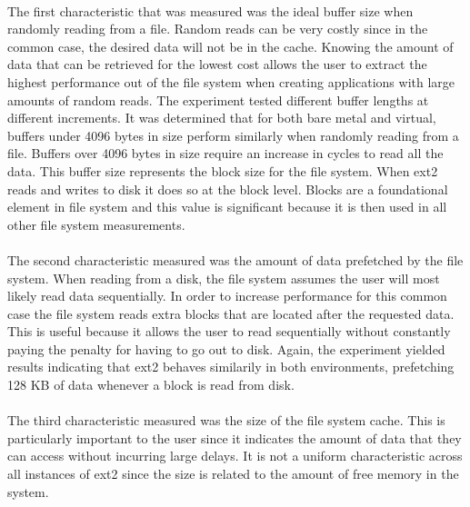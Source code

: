\documentclass[letterpaper,twocolumn,10pt]{article}
\begin{document}
\paragraph {}
The first characteristic that was measured was the ideal buffer size when randomly reading from a file. 
Random reads can be very costly since in the common case, the desired data will not be in the cache. 
Knowing the amount of data that can be retrieved for the lowest cost allows the user to extract the highest performance out of the file system when creating applications with large amounts of random reads. 
The experiment tested different buffer lengths at different increments. 
It was determined that for both bare metal and virtual, buffers under 4096 bytes in size perform similarly when randomly reading from a file. 
Buffers over 4096 bytes in size require an increase in cycles to read all the data. 
This buffer size represents the block size for the file system. 
When ext2 reads and writes to disk it does so at the block level.
Blocks are a foundational element in file system and this value is significant because it is then used in all other file system measurements.

\paragraph{}
The second characteristic measured was the amount of data prefetched by the file system. 
When reading from a disk, the file system assumes the user will most likely read data sequentially. 
In order to increase performance for this common case the file system reads extra blocks that are located after the requested data. 
This is useful because it allows the user to read sequentially without constantly paying the penalty for having to go out to disk. 
Again, the experiment yielded results indicating that ext2 behaves similarily in both environments, prefetching 128 KB of data whenever a block is read from disk.

\paragraph{}
The third characteristic measured was the size of the file system cache. 
This is particularly important to the user since it indicates the amount of data that they can access without incurring large delays. 
It is not a uniform characteristic across all instances of ext2 since the size is related to the amount of free memory in the system. 
\end{document}
